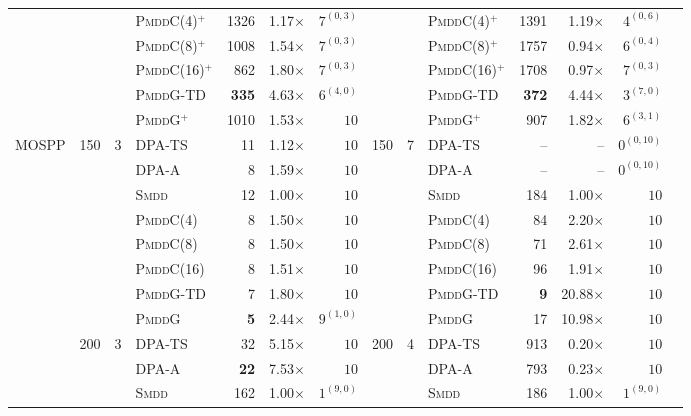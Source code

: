 \documentclass[letterpaper]{article}
\begin{document}
\begin{table}[htbp!]
{\begin{tabular}{lrrlrrrrrlrrrr}
 &  &  & \textsc{PmddC}(4)$^+$ & 1326 & 1.17$\times$ & $7^{(0, 3)}$ &  &  & \textsc{PmddC}(4)$^+$ & 1391 & 1.19$\times$ & $4^{(0, 6)}$ \\
 &  &  & \textsc{PmddC}(8)$^+$ & 1008 & 1.54$\times$ & $7^{(0, 3)}$ &  &  & \textsc{PmddC}(8)$^+$ & 1757 & 0.94$\times$ & $6^{(0, 4)}$ \\
 &  &  & \textsc{PmddC}(16)$^+$ & 862 & 1.80$\times$ & $7^{(0, 3)}$ &  &  & \textsc{PmddC}(16)$^+$ & 1708 & 0.97$\times$ & $7^{(0, 3)}$ \\
 &  &  & \textsc{PmddG-TD} & \textbf{335} & 4.63$\times$ & $6^{(4, 0)}$ &  &  & \textsc{PmddG-TD} & \textbf{372} & 4.44$\times$ & $3^{(7, 0)}$ \\
 &  &  & \textsc{PmddG}$^+$ & 1010 & 1.53$\times$ & $10$ &  &  & \textsc{PmddG}$^+$ & 907 & 1.82$\times$ & $6^{(3, 1)}$ \\
\midrule
\multirow{16}{*}{MOSPP} & \multirow{8}{*}{150} & \multirow{8}{*}{3} & DPA-TS & 11 & 1.12$\times$ & $10$ & \multirow{8}{*}{150} & \multirow{8}{*}{7} & DPA-TS & -- & -- & $0^{(0, 10)}$ \\
 &  &  & DPA-A & 8 & 1.59$\times$ & $10$ &  &  & DPA-A & -- & -- & $0^{(0, 10)}$ \\
 &  &  & \textsc{Smdd} & 12 & 1.00$\times$ & $10$ &  &  & \textsc{Smdd} & 184 & 1.00$\times$ & $10$ \\
 &  &  & \textsc{PmddC}(4) & 8 & 1.50$\times$ & $10$ &  &  & \textsc{PmddC}(4) & 84 & 2.20$\times$ & $10$ \\
 &  &  & \textsc{PmddC}(8) & 8 & 1.50$\times$ & $10$ &  &  & \textsc{PmddC}(8) & 71 & 2.61$\times$ & $10$ \\
 &  &  & \textsc{PmddC}(16) & 8 & 1.51$\times$ & $10$ &  &  & \textsc{PmddC}(16) & 96 & 1.91$\times$ & $10$  \\
 &  &  & \textsc{PmddG-TD} & 7 & 1.80$\times$ & $10$ &  &  & \textsc{PmddG-TD} & \textbf{9} & 20.88$\times$ & $10$  \\
 &  &  & \textsc{PmddG} & \textbf{5} & 2.44$\times$ & $9^{(1, 0)}$ &  &  & \textsc{PmddG} & 17 & 10.98$\times$ & $10$ \\
\cmidrule(lr){2-13}
 & \multirow{8}{*}{200} & \multirow{8}{*}{3} & DPA-TS & 32 & 5.15$\times$ & $10$ & \multirow{8}{*}{200} & \multirow{8}{*}{4} & DPA-TS & 913 & 0.20$\times$ & $10$\\
 &  &  & DPA-A & \textbf{22} & 7.53$\times$ & $10$ &  &  & DPA-A & 793 & 0.23$\times$ & $10$\\
 &  &  & \textsc{Smdd} & 162 & 1.00$\times$ & $1^{(9, 0)}$  &  &  & \textsc{Smdd} & 186 & 1.00$\times$ & $1^{(9, 0)}$ \\

\end{tabular}}
\end{table}
\end{document}
